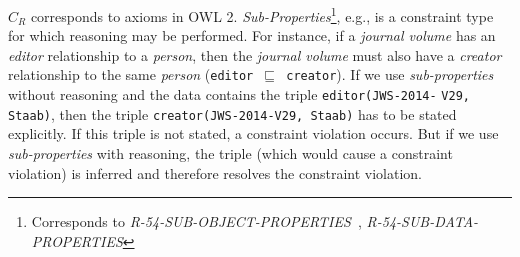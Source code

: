\documentclass{llncs}
\newcommand{\ms}[1]{\texttt{#1}}
\newcommand{\tb}[1]{\todo[size=\small, color=green!40]{\textbf{Thomas:} #1}}
\newcommand{\er}[1]{\todo[size=\small, color=red!40]{\textbf{Erman:} #1}}
\begin{document}
$C_R$ corresponds to axioms in OWL 2. %
{\em Sub-Properties}\footnote{Corresponds to \emph{R-54-SUB-OBJECT-PROPERTIES~}, \emph{R-54-SUB-DATA-PROPERTIES}}, e.g., 
is a constraint type for which reasoning may be performed.
For instance, if a \emph{journal volume} has an {\em editor} relationship to a \emph{person}, 
then the \emph{journal volume} must also have a {\em creator} relationship to the same \emph{person} (\ms{editor $\sqsubseteq$ creator}).
If we use \emph{sub-properties} without reasoning and the data contains the triple \ms{editor(JWS-2014-} \ms{V29, Staab)},
then the triple \ms{creator(JWS-2014-V29, Staab)} has to be stated explicitly.
If this triple is not stated, a constraint violation occurs.
But if we use \emph{sub-properties} with reasoning, the triple (which would cause a constraint violation) is inferred and therefore resolves the constraint violation.
\end{document}
